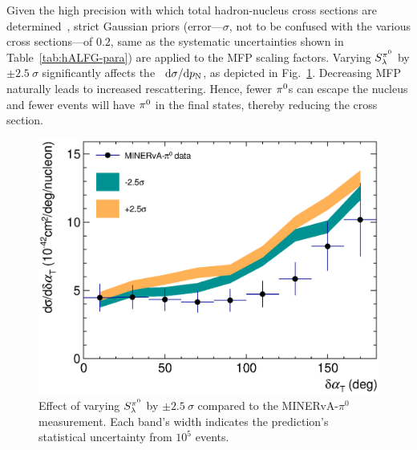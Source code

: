 \begin{enumerate}
    Given the high precision with which total hadron-nucleus cross sections are determined~\cite{LADS:1999dyv,Navon:1983xj,Carroll:1976hj,Clough:1974qt,BAUHOFF1986429}, strict Gaussian priors (error---$\sigma$, not to be confused with the various cross sections---of $0.2$, same as the systematic uncertainties shown in 
    Table~\ref{tab:hALFG-para}) are applied to the MFP scaling factors. 
    Varying $S_\lambda^{\pi^{0}}$ by $\pm2.5~\sigma$ significantly affects the \minpiz\ $\textrm{d}\sigma/\textrm{d}p_\textrm{N}$, as depicted in Fig.~\ref{fig:minpiz-pn-pi0mfp}. 
    Decreasing MFP naturally leads to increased rescattering. 
    Hence, fewer $\pi^0$s can escape the nucleus and fewer events will have $\pi^0$ in the final states, thereby reducing the cross section. 

    \begin{figure}[!htb]
        \centering
        \includegraphics[width=\sgfigwid\textwidth]{figures/tuning/minerva_pi0_dalphat_FSI_pi0mfp.eps}
        \caption{Effect of varying $S_\lambda^{\pi^{0}}$ by $\pm2.5~\sigma$ compared to the MINERvA-$\pi^0$ measurement. Each band's width indicates the \genie prediction's statistical uncertainty from $10^5$ events.}
        \label{fig:minpiz-pn-pi0mfp}
    \end{figure}


\end{enumerate}
